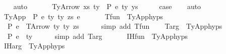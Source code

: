 \begin{isabellebody}
\ \ \isamarkupfalse%
\ auto\isanewline
\ \ \isamarkupfalse%
\isanewline
{}\isamarkupfalse%
\isanewline
\ \ \isamarkupfalse%
\ {\isacharparenleft}{\kern0pt}TyArrow\ xs\ ty{}\ {\isasymGamma}\ P\ e\ ty{}\ ys{\isacharparenright}{\kern0pt}\isanewline
\ \ \isamarkupfalse%
\ \isamarkupfalse%
\ {\isacharquery}{\kern0pt}case\isanewline
\ \ \isamarkupfalse%
\ auto\isanewline
\ \ \isamarkupfalse%
\isanewline
{}\isamarkupfalse%
\isanewline
\ \ \isamarkupfalse%
\ {\isacharparenleft}{\kern0pt}TyApp\ {\isasymGamma}\ P\ e{}\ ty{}\ ty{}\ zs\ e{}{\isacharparenright}{\kern0pt}\isanewline
\ \ \isanewline
\ \ \isamarkupfalse%
\ T{\isacharunderscore}{\kern0pt}fun\ {\isacharequal}{\kern0pt}\ TyApp{\isachardot}{\kern0pt}hyps{\isacharparenleft}{\kern0pt}{}{\isacharparenright}{\kern0pt}\ \ \ \isanewline
\ \ \isamarkupfalse%
\ {\isachardoublequoteopen}{\isasymGamma}\ {\isasymturnstile}{\isacharbraceleft}{\kern0pt}P{\isacharbraceright}{\kern0pt}\ e{}\ {\isacharcolon}{\kern0pt}\ TArrow\ ty{}\ ty{}\ zs{\isachardoublequoteclose}\isanewline
\ \ \ \ \isamarkupfalse%
\ {\isacharparenleft}{\kern0pt}simp\ add{\isacharcolon}{\kern0pt}\ T{\isacharunderscore}{\kern0pt}fun{\isacharparenright}{\kern0pt}\isanewline
\isanewline
\ \ \isamarkupfalse%
\ T{\isacharunderscore}{\kern0pt}arg\ {\isacharequal}{\kern0pt}\ TyApp{\isachardot}{\kern0pt}hyps{\isacharparenleft}{\kern0pt}{}{\isacharparenright}{\kern0pt}\ \ \ \isanewline
\ \ \isamarkupfalse%
\ {\isachardoublequoteopen}{\isasymGamma}\ {\isasymturnstile}{\isacharbraceleft}{\kern0pt}P{\isacharbraceright}{\kern0pt}\ e{}\ {\isacharcolon}{\kern0pt}\ ty{}{\isachardoublequoteclose}\isanewline
\ \ \ \ \isamarkupfalse%
\ {\isacharparenleft}{\kern0pt}simp\ add{\isacharcolon}{\kern0pt}\ T{\isacharunderscore}{\kern0pt}arg{\isacharparenright}{\kern0pt}\isanewline
\isanewline
\ \ \isanewline
\ \ \isamarkupfalse%
\ IH{\isacharunderscore}{\kern0pt}fun\ {\isacharequal}{\kern0pt}\ TyApp{\isachardot}{\kern0pt}hyps{\isacharparenleft}{\kern0pt}{}{\isacharparenright}{\kern0pt}\ \ \ \ \isanewline
\ \ \isamarkupfalse%
\ IH{\isacharunderscore}{\kern0pt}arg\ {\isacharequal}{\kern0pt}\ TyApp{\isachardot}{\kern0pt}hyps{\isacharparenleft}{\kern0pt}{}{\isacharparenright}{\kern0pt}\ \ \ \ \isanewline

\end{isabellebody}
